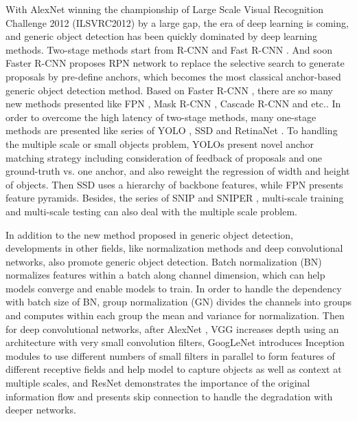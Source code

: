 \documentclass[final]{cvpr}
\begin{document}
With AlexNet \cite{krizhevsky2017imagenet} winning the championship of Large Scale Visual Recognition Challenge 2012 (ILSVRC2012) by a large gap, the era of deep learning is coming, and generic object detection has been quickly dominated by deep learning methods. Two-stage methods start from R-CNN \cite{girshick2014rich} and Fast R-CNN \cite{girshick2015fast}. And soon Faster R-CNN \cite{ren2015faster} proposes RPN network to replace the selective search to generate proposals by pre-define anchors, which becomes the most classical anchor-based generic object detection method. Based on Faster R-CNN \cite{ren2015faster}, there are so many new methods presented like FPN \cite{lin2017feature}, Mask R-CNN \cite{he2017mask}, Cascade R-CNN \cite{cai2018cascade} and etc.. In order to overcome the high latency of two-stage methods, many one-stage methods are presented like series of YOLO \cite{redmon2016you, redmon2017yolo9000, redmon2018yolov3}, SSD \cite{liu2016ssd} and RetinaNet \cite{lin2017focal}. To handling the multiple scale or small objects problem, YOLOs \cite{redmon2016you, redmon2017yolo9000, redmon2018yolov3} present novel anchor matching strategy including consideration of feedback of proposals and one ground-truth vs. one anchor, and also reweight the regression of width and height of objects. Then SSD \cite{liu2016ssd} uses a hierarchy of backbone features, while FPN \cite{lin2017feature} presents feature pyramids. Besides, the series of SNIP \cite{singh2018analysis} and SNIPER \cite{singh2018sniper}, multi-scale training and multi-scale testing can also deal with the multiple scale problem. 

In addition to the new method proposed in generic object detection, developments in other fields, like normalization methods and deep convolutional networks, also promote generic object detection. Batch normalization (BN) \cite{ioffe2015batch} normalizes features within a batch along channel dimension, which can help models converge and enable models to train. In order to handle the dependency with batch size of BN, group normalization (GN) \cite{wu2018group} divides the channels into groups and computes within each group the mean and variance for normalization. Then for deep convolutional networks, after AlexNet \cite{krizhevsky2017imagenet}, VGG \cite{simonyan2014very} increases depth using an architecture with very small  convolution filters, GoogLeNet \cite{szegedy2015going} introduces Inception modules to use different numbers of small filters in parallel to form features of different receptive fields and help model to capture objects as well as context at multiple scales, and ResNet \cite{he2016deep} demonstrates the importance of the original information flow and presents skip connection to handle the degradation with deeper networks.
\end{document}
